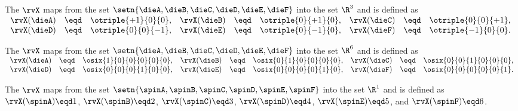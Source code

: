 \begin{definition}
\label{def:rv_dieR3}
The  $\rvX$ maps from the set $\setn{\dieA,\dieB,\dieC,\dieD,\dieE,\dieF}$ into the set $\R^3$
and is defined as 
\\\indentx$\begin{array}{rclrclrcl}
    \rvX(\dieA) &\eqd& \otriple{+1}{ 0}{ 0}, 
   &\rvX(\dieB) &\eqd& \otriple{ 0}{+1}{ 0}, 
   &\rvX(\dieC) &\eqd& \otriple{ 0}{ 0}{+1}, 
  \\\rvX(\dieD) &\eqd& \otriple{ 0}{ 0}{-1}, 
   &\rvX(\dieE) &\eqd& \otriple{ 0}{-1}{ 0},
   &\rvX(\dieF) &\eqd& \otriple{-1}{ 0}{ 0}.
\end{array}$
\end{definition}

\begin{definition}
\label{def:rv_dieR6}
The  $\rvX$ maps from the set $\setn{\dieA,\dieB,\dieC,\dieD,\dieE,\dieF}$ into the set $\R^6$
and is defined as 
\\\indentx$\begin{array}{rclrclrcl}
    \rvX(\dieA) &\eqd& \osix{1}{0}{0}{0}{0}{0}, 
   &\rvX(\dieB) &\eqd& \osix{0}{1}{0}{0}{0}{0}, 
   &\rvX(\dieC) &\eqd& \osix{0}{0}{1}{0}{0}{0}, 
  \\\rvX(\dieD) &\eqd& \osix{0}{0}{0}{1}{0}{0}, 
   &\rvX(\dieE) &\eqd& \osix{0}{0}{0}{0}{1}{0},
   &\rvX(\dieF) &\eqd& \osix{0}{0}{0}{0}{0}{1}.
\end{array}$
\end{definition}

\begin{definition}
\label{def:rv_spinR1}
The  $\rvX$ maps from the set $\setn{\spinA,\spinB,\spinC,\spinD,\spinE,\spinF}$ into the set $\R^1$
and is defined as\footnotemark
\\\indentx
  $\rvX(\spinA)\eqd 1$, 
  $\rvX(\spinB)\eqd 2$, 
  $\rvX(\spinC)\eqd 3$, 
  $\rvX(\spinD)\eqd 4$, 
  $\rvX(\spinE)\eqd 5$, and 
  $\rvX(\spinF)\eqd 6$.
\end{definition}

